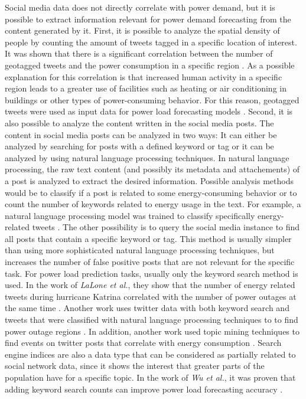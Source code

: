 Social media data does not directly correlate with power demand, but it is
possible to extract information relevant for power demand forecasting
from the content generated by it.
First, it is possible to analyze the spatial density of people by 
counting the amount of tweets tagged in a specific location of interest. 
It was shown that there is a significant
correlation between the number of geotagged tweets
and the power consumption in a specific region \cite{twittergeoloccorr}.
As a possible explanation for this correlation is that 
increased human activity in a specific region leads to a greater 
use of facilities such as heating or air conditioning in buildings or 
other types of power-consuming behavior.
For this reason, geotagged tweets were used as input data for 
power load forecasting models 
\cite{twittergeolocforecasting} \cite{twittergeolocforecasting2}.
Second, it is also possible to analyze the content written in the 
social media posts. The content in social media posts can be 
analyzed in two ways: 
It can either be analyzed by searching for posts with a defined keyword or tag
or it can be analyzed by using natural language processing techniques. 
In natural language processing, the raw text content 
(and possibly its metadata and attachements) of a post is analyzed
to extract the desired information. Possible analysis
methods would be to classify if a post is related to some energy-consuming
behavior or to count the number of keywords related to energy usage in the text.
For example, a natural language processing model was trained to 
classify specifically energy-related tweets \cite{energybert}.
The other possibility is to query the social media instance 
to find all posts that contain a specific keyword or tag.
This method is usually simpler than using more sophisticated natural 
language processing techniques, but increases the number of false positive 
posts that are not relevant for the specific task.
For power load prediction tasks, usually only the keyword search method is used.
In the work of \textit{LaLone et al.}, they show that the number of energy
related tweets during hurricane Katrina correlated with the number of 
power outages at the same time \cite{poweroutagetwitter}.
Another work uses twitter data with both keyword search and 
tweets that were classified with natural language processing techniques to
to find power outage regions \cite{twitterpoweroutagelighttime}.
In addition, another work used topic mining techniques to find
events on twitter posts that correlate with energy consumption 
\cite{twittertopicevent}.
Search engine indices are also a data type that can be considered 
as partially related to social network data, since it shows the 
interest that greater parts of the population have for a specific topic.
In the work of \textit{Wu et al.}, it was proven that adding 
keyword search counts can improve power load forecasting accuracy 
\cite{googlepowerforecast}.


